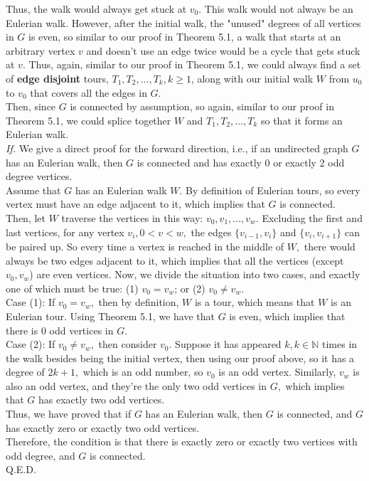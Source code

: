 \documentclass{article}
\begin{document}
Thus, the walk would always get stuck at $v_0.$ This walk would not always be an Eulerian walk. However, after the initial walk, the "unused" degrees of all vertices in $G$ is even, so similar to our proof in Theorem 5.1, a walk that starts at an arbitrary vertex $v$ and doesn't use an edge twice would be a cycle that gets stuck at $v.$ Thus, again, similar to our proof in Theorem 5.1, we could always find a set of \textbf{edge disjoint} tours, $T_1, T_2, ..., T_k, k\geq 1$, along with our initial walk $W$ from $u_0$ to $v_0$ that covers all the edges in $G.$ \\[.1cm]
\indent Then, since $G$ is connected by assumption, so again, similar to our proof in Theorem 5.1, we could splice together $W$ and $T_1, T_2, ..., T_k$ so that it forms an Eulerian walk. \\[.3cm]
\textit{If.} We give a direct proof for the forward direction, i.e., if an undirected graph $G$ has an Eulerian walk, then $G$ is connected and has exactly 0 or exactly 2 odd degree vertices. \\[.3cm]
\indent Assume that $G$ has an Eulerian walk $W.$ By definition of Eulerian tours, so every vertex must have an edge adjacent to it, which implies that $G$ is connected. \\[.3cm]
\indent Then, let $W$ traverse the vertices in this way: $v_0, v_1, ..., v_w.$ Excluding the first and last vertices, for any vertex $v_i, 0<v<w,$ the edges $\{v_{i-1}, v_i\}$ and $\{v_{i}, v_{i+1}\}$ can be paired up. So every time a vertex is reached in the middle of $W,$ there would always be two edges adjacent to it, which implies that all the vertices (except $v_0, v_w$) are even vertices. Now, we divide the situation into two cases, and exactly one of which must be true: (1) $v_0 = v_w$; or (2) $v_0\neq v_w.$ \\[.3cm]
\indent Case (1): If $v_0 = v_w,$ then by definition, $W$ is a tour, which means that $W$ is an Eulerian tour. Using Theorem 5.1, we have that $G$ is even, which implies that there is 0 odd vertices in $G.$ \\[.3cm]
\indent Case (2): If $v_0\neq v_w,$ then consider $v_0.$ Suppose it has appeared $k, k\in\mathbb{N}$ times in the walk besides being the initial vertex, then using our proof above, so it has a degree of $2k + 1,$ which is an odd number, so $v_0$ is an odd vertex. Similarly, $v_w$ is also an odd vertex, and they're the only two odd vertices in $G,$ which implies that $G$ has exactly two odd vertices. \\[.3cm]
\indent Thus, we have proved that if $G$ has an Eulerian walk, then $G$ is connected, and $G$ has exactly zero or exactly two odd vertices. \\[.5cm]
Therefore, the condition is that there is exactly zero or exactly two vertices with odd degree, and $G$ is connected. \\[.3cm]
Q.E.D.
\end{document}
